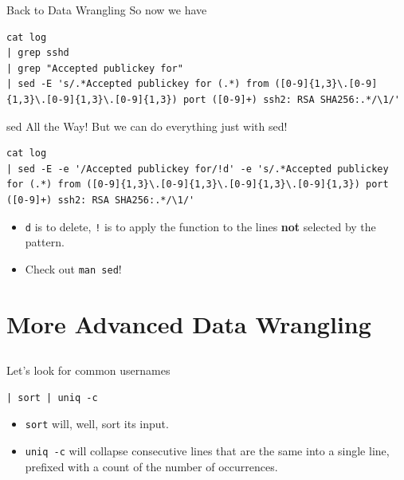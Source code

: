 \documentclass[12pt]{beamer}
\begin{document}
\begin{frame}[fragile]{Back to Data Wrangling}
  So now we have
  \begin{verbatim}
cat log
| grep sshd
| grep "Accepted publickey for"
| sed -E 's/.*Accepted publickey for (.*) from ([0-9]{1,3}\.[0-9]{1,3}\.[0-9]{1,3}\.[0-9]{1,3}) port ([0-9]+) ssh2: RSA SHA256:.*/\1/'
  \end{verbatim}
\end{frame}

\begin{frame}[fragile]{sed All the Way!}
  But we can do everything just with sed!
  \begin{verbatim}
cat log
| sed -E -e '/Accepted publickey for/!d' -e 's/.*Accepted publickey for (.*) from ([0-9]{1,3}\.[0-9]{1,3}\.[0-9]{1,3}\.[0-9]{1,3}) port ([0-9]+) ssh2: RSA SHA256:.*/\1/'
  \end{verbatim}
  \begin{itemize}
    \item \texttt{d} is to delete, \texttt{!} is to apply the function to the lines \textbf{not} selected by the pattern.
    \item Check out \texttt{man sed}!
  \end{itemize}
\end{frame}

\section{More Advanced Data Wrangling}
\subsection{}
\begin{frame}[fragile]{Let's look for common usernames}
  \begin{verbatim}
| sort | uniq -c
  \end{verbatim}
  \begin{itemize}
    \item \texttt{sort} will, well, sort its input.
    \item \texttt{uniq -c} will collapse consecutive lines that are the same into a single line, prefixed with a count of the number of occurrences.
  \end{itemize}
\end{frame}
\end{document}
